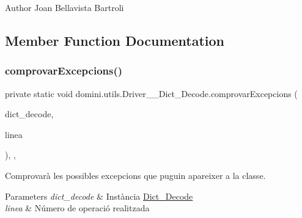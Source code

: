\begin{DoxyAuthor}{Author}
Joan Bellavista Bartroli 
\end{DoxyAuthor}


\subsection{Member Function Documentation}
\mbox{\label{classdomini_1_1utils_1_1Driver____Dict__Decode_a41ddfd0f1473de9401aa7860cff2f3e8}} 
\subsubsection{\texorpdfstring{comprovar\+Excepcions()}{comprovarExcepcions()}}
{\footnotesize\ttfamily private static void domini.\+utils.\+Driver\+\_\+\+\_\+\+Dict\+\_\+\+Decode.\+comprovar\+Excepcions (\begin{DoxyParamCaption}\item[{\hyperlink{classdomini_1_1utils_1_1Dict__Decode}{Dict\+\_\+\+Decode}}]{dict\+\_\+decode,  }\item[{String}]{linea }\end{DoxyParamCaption})\hspace{0.3cm}{\ttfamily [inline]}, {\ttfamily [static]}, {\ttfamily [private]}}



Comprovarà les possibles excepcions que puguin apareixer a la classe. 


\begin{DoxyParams}{Parameters}
{\em dict\+\_\+decode} & Instància \hyperlink{classdomini_1_1utils_1_1Dict__Decode}{Dict\+\_\+\+Decode} \\
\hline
{\em linea} & Número de operació realitzada \\
\hline
\end{DoxyParams}
\mbox{\label{classdomini_1_1utils_1_1Driver____Dict__Decode_a5045c12e35617afd929dfeb30930d541}} 
